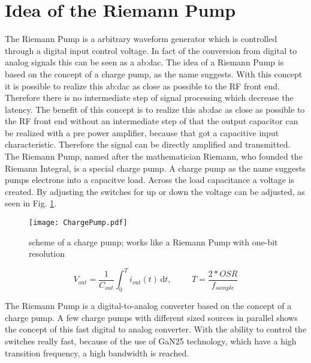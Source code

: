 \section{Idea of the Riemann Pump}
The Riemann Pump is a arbitrary waveform generator which is controlled through a digital input control voltage.
In fact of the conversion from digital to analog signals this can be seen as a \gls{ab:dac}.
The idea of a Riemann Pump is based on the concept of a charge pump, as the name suggests.
With this concept it is possible to realize this \gls{ab:dac} as close as possible to the RF front end.
Therefore there is no intermediate step of signal processing which decrease the latency.
The benefit of this concept is to realize this \gls{ab:dac} as close as possible to the RF front end without an intermediate step of
that the output capacitor can be realized with a pre power amplifier, because that got a capacitive input characteristic.
Therefore the signal can be directly amplified and transmitted.
The Riemann Pump, named after the mathematician Riemann, who founded the Riemann Integral, is a special charge pump. A charge pump as the name suggests pumps electrons into a capacitve load. Across the load capacitance a voltage is created. By adjusting the switches for up or down the voltage can be adjusted, as seen in Fig. \ref{fig:ChargePump}. 

\begin{figure}[ht]
	\centering
  \texttt{[image: ChargePump.pdf]}
	\caption{scheme of a charge pump; works like a Riemann Pump with one-bit resolution}
	\label{fig:ChargePump}
\end{figure}

\begin{equation}
	V_{out} = \frac{1}{C_{out}}{ \int_0^T \! i_{out}(t) \, \mathrm{d}t} , \hspace{1cm} T = \frac{2*OSR}{f_{sample}}
\end{equation}

The Riemann Pump is a digital-to-analog converter based on the concept of a charge pump. A few charge pumps with different sized sources in parallel shows the concept of this fast digital to analog converter. With the ability to control the switches really fast, because of the use of GaN25 technology, which have a high transition frequency, a high bandwidth is reached.

